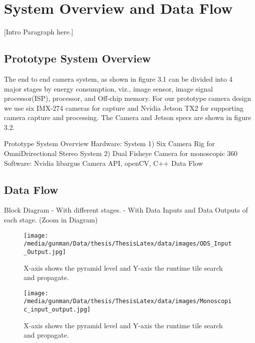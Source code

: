 \chapter{System Overview and Data Flow}


[Intro Paragraph here.]


\section{Prototype System Overview}
The end to end camera system, as shown in figure 3.1 can be divided into 4 major stages by energy consumption, viz., image sensor, image signal processor(ISP), processor, and Off-chip memory. For our prototype camera design we use six IMX-274 cameras for capture and Nvidia Jetson TX2 for supporting camera capture and processing. The Camera and Jetson specs are shown in figure 3.2. 

Prototype System Overview\newline
Hardware:
System 1) Six Camera Rig for OmniDrirectional Stereo\newline
System 2) Dual Fisheye Camera for monoscopic 360 \newline
Software:
Nvidia libargus Camera API,
openCV, C++ \newline
Data Flow \newline

\section{Data Flow}
Block Diagram
- With different stages.
- With Data Inputs and Data Outputs of each stage. (Zoom in Diagram)

\begin{figure*}
	\begin{center}
		\texttt{[image: /media/gunman/Data/thesis/ThesisLatex/data/images/ODS\_Input\_Output.jpg]}
		\caption{X-axis shows the pyramid level and Y-axis the runtime tile search and propagate.}
		\label{ODS_Input_Output}
	\end{center}
	\vspace{-0.3in}
\end{figure*} 


\begin{figure*}
	\begin{center}
		\texttt{[image: /media/gunman/Data/thesis/ThesisLatex/data/images/Monoscopic\_input\_output.jpg]}
		\caption{X-axis shows the pyramid level and Y-axis the runtime tile search and propagate.}
		\label{Monoscopic_Input_Output}
	\end{center}
	\vspace{-0.3in}
\end{figure*} 